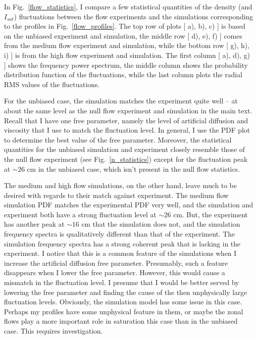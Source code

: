 In Fig.~\ref{flow_statistics}, I compare a few statistical quantities of the density (and $I_{sat}$) fluctuations
between the flow experiments and the simulations corresponding to the profiles in Fig.~\ref{flow_profiles}. The top row
of plots [ a), b), c) ] is based on the unbiased experiment and simulation, the middle row [ d), e), f) ] comes from the medium flow experiment and simulation, 
while the bottom row [ g), h), i) ] is from the high flow experiment and simulation. The first column [ a), d), g) ] shows the frequency power spectrum, the middle column shows the probability
distribution function of the fluctuations, while the last column plots the radial RMS values of the fluctuations.

For the unbiased case, the simulation matches the experiment quite well -- at about the same level as the null flow experiment and simulation in the main text. Recall that I have one free parameter,
namely the level of artificial diffusion and viscosity that I use to match the fluctuation level. In general, I use the PDF plot to determine the best value of the free parameter. Moreover,
the statistical quantities for the unbiased simulation and experiment closely resemble those of the null flow experiment (see Fig.~\ref{n_statistics}) except for the fluctuation peak at $\sim 26$ cm
in the unbiased case, which isn't present in the null flow statistics.

The medium and high flow simulations, on the other hand, leave much to be desired with regards to their match against experiment. The medium flow simulation PDF matches the experimental PDF very well,
and the simulation and experiment both have a strong fluctuation level at $\sim 26$ cm. But, the experiment has another peak at $\sim 16$ cm that the simulation does not, and the simulation
frequency spectra is qualitatively different than that of the experiment. The simulation frequency spectra has a strong coherent peak that is lacking in the experiment. I notice that this is
a common feature of the simulations when I increase the artificial diffusion free parameter. Presumably, such a feature disappears when I lower the free parameter. However, this would cause
a mismatch in the fluctuation level. I presume that I would be better served by lowering the free parameter and finding the cause of the then unphysically large fluctuation levels.
Obviously, the simulation model has some issue in this case. Perhaps my profiles have some unphysical feature in them, or maybe the zonal flows play a more
important role in saturation this case than in the unbiased case. This requires investigation.

